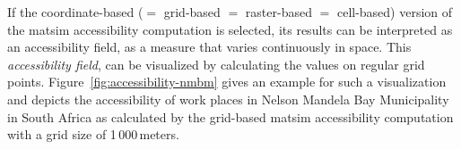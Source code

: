 %
%
%

If the coordinate-based ($=$ grid-based $=$ raster-based $=$ cell-based) version of the \gls{matsim} accessibility
computation is selected, its results can be interpreted as an accessibility field, \ie as a measure
that varies continuously in space. This \emph{accessibility field}, can be visualized by calculating
the values on regular grid points. Figure~\ref{fig:accessibility-nmbm} gives an example for such a
visualization and depicts the accessibility of work places in Nelson Mandela Bay Municipality in South
Africa as calculated by the grid-based \gls{matsim} accessibility computation with a grid size 
of 1\,000\,meters.

